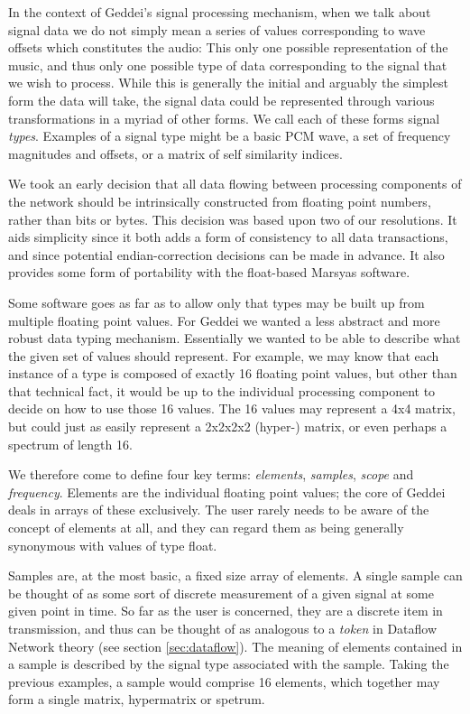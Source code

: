 In the context of Geddei's signal processing mechanism, when we talk about signal data we do not simply mean a series of values corresponding to wave offsets which constitutes the audio: This only one possible representation of the music, and thus only one possible type of data corresponding to the signal that we wish to process. While this is generally the initial and arguably the simplest form the data will take, the signal data could be represented through various transformations in a myriad of other forms. We call each of these forms signal {\it types}. Examples of a signal type might be a basic PCM wave, a set of frequency magnitudes and offsets, or a matrix of self similarity indices.

We took an early decision that all data flowing between processing components of the network should be intrinsically constructed from floating point numbers, rather than bits or bytes. This decision was based upon two of our resolutions. It aids simplicity since it both adds a form of consistency to all data transactions, and since potential endian-correction decisions can be made in advance. It also provides some form of portability with the float-based Marsyas software.

Some software goes as far as to allow only that types may be built up from multiple floating point values. For Geddei we wanted a less abstract and more robust data typing mechanism. Essentially we wanted to be able to describe what the given set of values should represent. For example, we may know that each instance of a type is composed of exactly 16 floating point values, but other than that technical fact, it would be up to the individual processing component to decide on how to use those 16 values. The 16 values may represent a 4x4 matrix, but could just as easily represent a 2x2x2x2 (hyper-) matrix, or even perhaps a spectrum of length 16.

We therefore come to define four key terms: \textit{elements}, \textit{samples}, \textit{scope} and \textit{frequency}. Elements are the individual floating point values; the core of Geddei deals in arrays of these exclusively. The user rarely needs to be aware of the concept of elements at all, and they can regard them as being generally synonymous with values of type float.

Samples are, at the most basic, a fixed size array of elements. A single sample can be thought of as some sort of discrete measurement of a given signal at some given point in time. So far as the user is concerned, they are a discrete item in transmission, and thus can be thought of as analogous to a \textit{token} in Dataflow Network theory (see section \ref{sec:dataflow}). The meaning of elements contained in a sample is described by the signal type associated with the sample. Taking the previous examples, a sample would comprise 16 elements, which together may form a single matrix, hypermatrix or spetrum.

